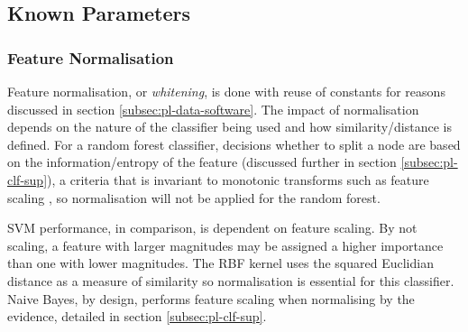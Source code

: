          
  
    
        
    \subsection{Known Parameters}
    \label{subsec:exp-clf-known}  
        \subsubsection{Feature Normalisation}
        \label{subsubsec:exp-clf-known-featnorm}
            Feature normalisation, or \textit{whitening}, is done with reuse of constants for reasons discussed in section \ref{subsec:pl-data-software}. The impact of normalisation depends on the nature of the classifier being used and how similarity/distance is defined. For a random forest classifier, decisions whether to split a node are based on the information/entropy of the feature (discussed further in section \ref{subsec:pl-clf-sup}), a criteria that is invariant to monotonic transforms such as feature scaling \cite{Hastie2009}, so normalisation will not be applied for the random forest.
            
            SVM performance, in comparison, is dependent on feature scaling. By not scaling, a feature with larger magnitudes may be assigned a higher importance than one with lower magnitudes. The RBF kernel uses the squared Euclidian distance as a measure of similarity so normalisation is essential for this classifier. Naive Bayes, by design, performs feature scaling when normalising by the evidence, detailed in section \ref{subsec:pl-clf-sup}.
            
